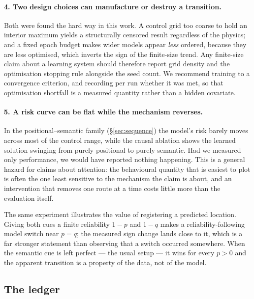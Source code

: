 \paragraph{4. Two design choices can manufacture or destroy a transition.}
Both were found the hard way in this work. A control grid too coarse to hold an
interior maximum yields a structurally censored result regardless of the
physics; and a fixed epoch budget makes wider models appear \emph{less} ordered,
because they are less optimised, which inverts the sign of the finite-size
trend. Any finite-size claim about a learning system should therefore report
grid density and the optimisation stopping rule alongside the seed count. We
recommend training to a convergence criterion, and recording per run whether it
was met, so that optimisation shortfall is a measured quantity rather than a
hidden covariate.

\paragraph{5. A risk curve can be flat while the mechanism reverses.}
In the positional--semantic family (\S\ref{sec:sequence}) the model's risk
barely moves across most of the control range, while the causal ablation shows
the learned solution swinging from purely positional to purely semantic. Had we
measured only performance, we would have reported nothing happening. This is a
general hazard for claims about attention: the behavioural quantity that is
easiest to plot is often the one least sensitive to the mechanism the claim is
about, and an intervention that removes one route at a time costs little more
than the evaluation itself.

The same experiment illustrates the value of registering a predicted location.
Giving both cues a finite reliability $1-p$ and $1-q$ makes a
reliability-following model switch near $p=q$; the measured sign change lands
close to it, which is a far stronger statement than observing that a switch
occurred somewhere. When the semantic cue is left perfect --- the usual setup ---
it wins for every $p>0$ and the apparent transition is a property of the data,
not of the model.

\subsection{The ledger}


